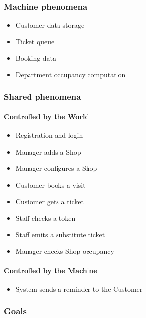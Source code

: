 \subsubsection{Machine phenomena}
\begin{itemize}
    \item Customer data storage
    \item Ticket queue
    \item Booking data
    \item Department occupancy computation
\end{itemize}

\subsubsection{Shared phenomena}

\paragraph{Controlled by the World}
\begin{itemize}
    \item Registration and login
    \item Manager adds a Shop
    \item Manager configures a Shop
    \item Customer books a visit
    \item Customer gets a ticket
    \item Staff checks a token
    \item Staff emits a substitute ticket
    \item Manager checks Shop occupancy
\end{itemize}

\paragraph{Controlled by the Machine}
\begin{itemize}
    \item System sends a reminder to the Customer
\end{itemize}

\subsubsection{Goals}

